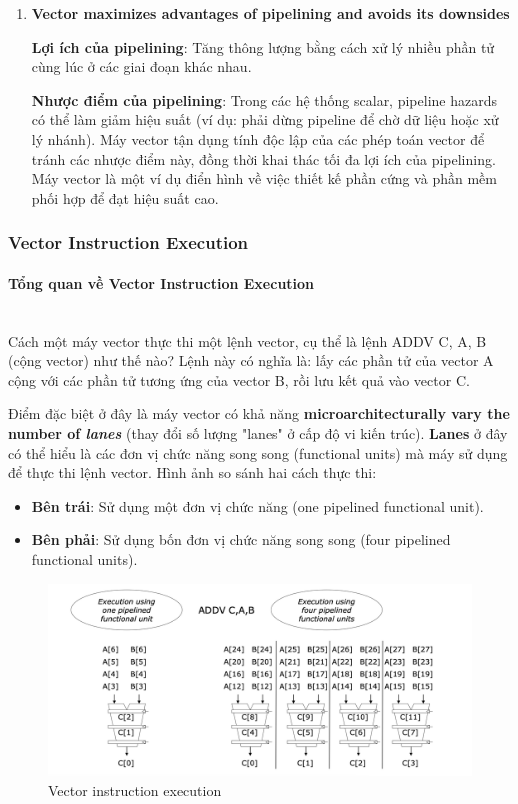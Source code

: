 \documentclass[a4paper]{article}
\begin{document}
\begin{enumerate}
    \item \textbf{Vector maximizes advantages of pipelining and avoids its downsides} \par \textbf{Lợi ích của pipelining}: Tăng thông lượng bằng cách xử lý nhiều phần tử cùng lúc ở các giai đoạn khác nhau.
    
    \textbf{Nhược điểm của pipelining}: Trong các hệ thống scalar, pipeline hazards có thể làm giảm hiệu suất (ví dụ: phải dừng pipeline để chờ dữ liệu hoặc xử lý nhánh).
    Máy vector tận dụng tính độc lập của các phép toán vector để tránh các nhược điểm này, đồng thời khai thác tối đa lợi ích của pipelining.	Máy vector là một ví dụ điển hình về việc thiết kế phần cứng và phần mềm phối hợp để đạt hiệu suất cao.
\end{enumerate}

\subsubsection{Vector Instruction Execution}
\paragraph{Tổng quan về Vector Instruction Execution}\leavevmode\\

Cách một máy vector thực thi một lệnh vector, cụ thể là lệnh ADDV C, A, B (cộng vector) như thế nào? Lệnh này có nghĩa là: lấy các phần tử của vector A cộng với các phần tử tương ứng của vector B, rồi lưu kết quả vào vector C.

Điểm đặc biệt ở đây là máy vector có khả năng \textbf{microarchitecturally vary the number of \textit{lanes}} (thay đổi số lượng "lanes" ở cấp độ vi kiến trúc). \textbf{Lanes} ở đây có thể hiểu là các đơn vị chức năng song song (functional units) mà máy sử dụng để thực thi lệnh vector. Hình ảnh so sánh hai cách thực thi:
\begin{itemize}
    \item \textbf{Bên trái}: Sử dụng một đơn vị chức năng (one pipelined functional unit).
    \item \textbf{Bên phải}: Sử dụng bốn đơn vị chức năng song song (four pipelined functional units).
\end{itemize}

\begin{figure}[H]
    \centering
    \includegraphics[width=1\linewidth]{assets/vector-instruction-execution.png}
    \caption{Vector instruction execution}
    \label{fig:enter-label}
\end{figure}
\end{document}
